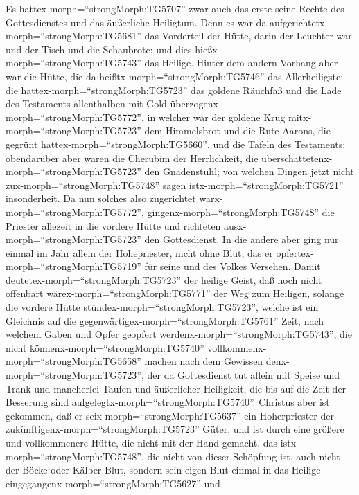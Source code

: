  Es hattex-morph=``strongMorph:TG5707'' zwar auch das erste
seine Rechte des Gottesdienstes und das äußerliche Heiligtum.
 Denn es war da aufgerichtetx-morph=``strongMorph:TG5681''
das Vorderteil der Hütte, darin der Leuchter war und der Tisch und die
Schaubrote; und dies hießx-morph=``strongMorph:TG5743'' das Heilige.
 Hinter dem andern Vorhang aber war die Hütte, die da
heißtx-morph=``strongMorph:TG5746'' das Allerheiligste;  die
hattex-morph=``strongMorph:TG5723'' das goldene Räuchfaß und die Lade
des Testaments allenthalben mit Gold
überzogenx-morph=``strongMorph:TG5772'', in welcher war der goldene Krug
mitx-morph=``strongMorph:TG5723'' dem Himmelsbrot und die Rute Aarons,
die gegrünt hattex-morph=``strongMorph:TG5660'', und die Tafeln des
Testaments;  obendarüber aber waren die Cherubim der
Herrlichkeit, die überschattetenx-morph=``strongMorph:TG5723'' den
Gnadenstuhl; von welchen Dingen jetzt nicht
zux-morph=``strongMorph:TG5748'' sagen istx-morph=``strongMorph:TG5721''
insonderheit.  Da nun solches also zugerichtet
warx-morph=``strongMorph:TG5772'', gingenx-morph=``strongMorph:TG5748''
die Priester allezeit in die vordere Hütte und richteten
ausx-morph=``strongMorph:TG5723'' den Gottesdienst.  In die
andere aber ging nur einmal im Jahr allein der Hohepriester, nicht ohne
Blut, das er opfertex-morph=``strongMorph:TG5719'' für seine und des
Volkes Versehen.  Damit
deutetex-morph=``strongMorph:TG5723'' der heilige Geist, daß noch nicht
offenbart wärex-morph=``strongMorph:TG5771'' der Weg zum Heiligen,
solange die vordere Hütte stündex-morph=``strongMorph:TG5723'',
 welche ist ein Gleichnis auf die
gegenwärtigex-morph=``strongMorph:TG5761'' Zeit, nach welchem Gaben und
Opfer geopfert werdenx-morph=``strongMorph:TG5743'', die nicht
könnenx-morph=``strongMorph:TG5740''
vollkommenx-morph=``strongMorph:TG5658'' machen nach dem Gewissen
denx-morph=``strongMorph:TG5723'', der da Gottesdienst tut 
allein mit Speise und Trank und mancherlei Taufen und äußerlicher
Heiligkeit, die bis auf die Zeit der Besserung sind
aufgelegtx-morph=``strongMorph:TG5740''.  Christus aber ist
gekommen, daß er seix-morph=``strongMorph:TG5637'' ein Hoherpriester der
zukünftigenx-morph=``strongMorph:TG5723'' Güter, und ist durch eine
größere und vollkommenere Hütte, die nicht mit der Hand gemacht, das
istx-morph=``strongMorph:TG5748'', die nicht von dieser Schöpfung ist,
 auch nicht der Böcke oder Kälber Blut, sondern sein eigen
Blut einmal in das Heilige eingegangenx-morph=``strongMorph:TG5627'' und
